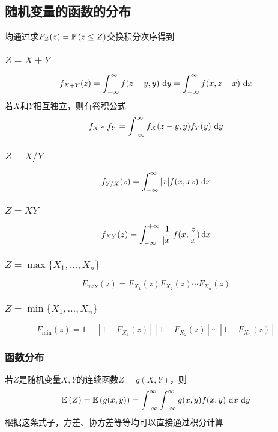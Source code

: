 \subsection{随机变量的函数的分布}
均通过求$F_Z(z)=\mathbb{P}\left(z\leq Z\right)$交换积分次序得到
\subsubsection{$Z=X+Y$}
\[f_{X+Y}(z)=\displaystyle\int_{-\infty}^{\infty}{f(z-y,y)}\,\,\mathrm{d} y=\displaystyle\int_{-\infty}^{\infty}{f(x,z-x)}\,\,\mathrm{d} x\]
若$X$和$Y$相互独立，则有卷积公式
\[f_X*f_Y=\displaystyle\int_{-\infty}^{\infty}{f_X(z-y,y)f_Y(y)}\,\,\mathrm{d} y\]
\subsubsection{$Z=X/Y$}
\[f_{Y/X}(z)=\displaystyle\int_{-\infty}^{\infty}{|x|f(x,xz)}\,\,\mathrm{d} x\]
\subsubsection{$Z=XY$}
\[f_{XY}(z)=\displaystyle\int_{-\infty}^{+\infty}\dfrac{1}{|x|}f(x,\dfrac{z}{x})\,\mathrm{d} x\]
\subsubsection{$Z=\max\{X_1,\ldots,X_n\}$}
\[F_{\max}(z)=F_{X_1}(z)F_{X_2}(z)\cdots F_{X_n}(z)\]
\subsubsection{$Z=\min\{X_1,\ldots,X_n\}$}
\[F_{\min}(z)=1-[1-F_{X_1}(z)][1-F_{X_2}(z)]\cdots [1-F_{X_n}(z)]\]
\subsubsection{函数分布}
若$Z$是随机变量$X,Y$的连续函数$Z=g(X,Y)$，则
\[\mathbb{E}\left(Z\right)=\mathbb{E}\left(g(x,y)\right)=\displaystyle\int_{-\infty}^{\infty}{\displaystyle\int_{-\infty}^{\infty}{g(x,y)f(x,y)}\,\,\mathrm{d} x}\,\,\mathrm{d} y\]
根据这条式子，方差、协方差等等均可以直接通过积分计算

